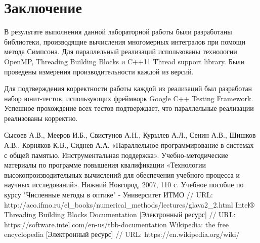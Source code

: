 \documentclass{report}
\begin{document}
\section*{Заключение}
В результате выполнения данной лабораторной работы были разработаны библиотеки, производящие вычисления многомерных интегралов при помощи метода Симпсона. Для параллельный реализаций использованы технологии OpenMP, Threading Building Blocks и C++11 Thread support library. Были проведены измерения производительности каждой из версий.
\par Для подтверждения корректности работы каждой из реализаций был разработан набор юнит-тестов, использующих фреймворк Google C++ Testing Framework. Успешное прохождение всех тестов подтверждает, что параллельные реализации реализованы корректно.
\newpage


\begin{thebibliography}{1}
 Сысоев А.В., Мееров И.Б., Свистунов А.Н., Курылев А.Л., Сенин А.В., Шишков А.В., Корняков К.В., Сиднев А.А. «Параллельное программирование в системах с общей памятью. Инструментальная поддержка». Учебно-методические материалы по программе повышения квалификации «Технологии высокопроизводительных вычислений для обеспечения учебного процесса и научных исследований». Нижний Новгород, 2007, 110 с.
 Учебное пособие по курсу "Численные методы в оптике" - Университет ИТМО // URL: http://aco.ifmo.ru/el\_books/numerical\_methods/lectures/glava2\_2.html
 Intel® Threading Building Blocks Documentation [Электронный ресурс] // URL: https://software.intel.com/en-us/tbb-documentation
 Wikipedia: the free encyclopedia [Электронный ресурс] // URL: https://en.wikipedia.org/wiki/
\end{thebibliography}
\newpage
\end{document}
